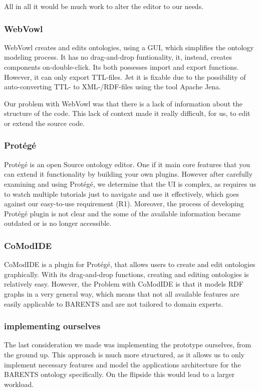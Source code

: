 \documentclass[sigconf]{acmart}
\begin{document}
            All in all it would be much work to alter the editor to our needs.

        \subsubsection{WebVowl}
            WebVowl creates and edits ontologies, using a GUI, which simplifies the ontology modeling process.
            It has no drag-and-drop funtionality, it, instead,  creates components on-double-click.
            Its both possesses import and export functions.
            However, it can only export TTL-files.
            Jet it is fixable due to the possibility of auto-converting TTL- to XML-/RDF-files using the tool Apache Jena.

            Our problem with WebVowl was that there is a lack of information about the structure of the code.
            This lack of context made it really difficult, for us, to edit or extend the source code.
        \subsubsection{Protégé}
            Protégé is an open Source ontology editor\cite{musen2015protege}. One if it main core features that you can extend it functionality by building your own plugins. However after carefully examining and using Protégé, we determine that the UI is complex, as requires us to watch multiple tutorials just to navigate and use it effectively, which goes against our easy-to-use requirement (R1).
            Moreover, the process of developing Protégé plugin is not clear and the some of the available information became outdated or is no longer accessible. 
        \subsubsection{CoModIDE}
        CoModIDE is a plugin for Protégé, that allows users to create and edit ontologies graphically\cite{shimizu2019comodide}. With its drag-and-drop functions, creating and editing ontologies is relatively easy. However, the Problem with CoModIDE is that it models RDF graphs in a very general way, which means that not all available features are easily applicable to BARENTS and are not tailored to domain experts.  
        \subsubsection{implementing ourselves}
            The last consideration we made was implementing the prototype ourselves, from the ground up. 
            This approach is much more structured, as it allows us to only implement necessary features and model the applications architecture for the BARENTS ontology specifically. 
            On the flipside this would lead to a larger workload. 
\end{document}
